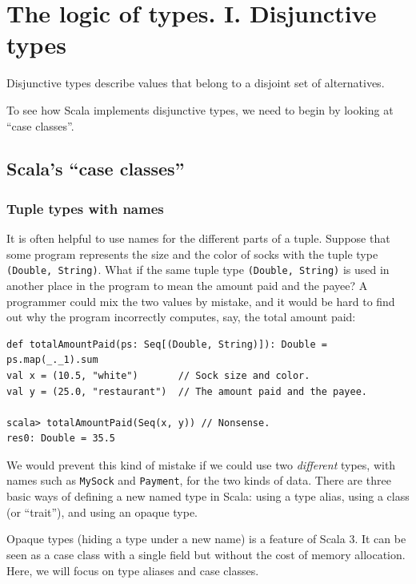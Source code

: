 
\chapter{The logic of types. I. Disjunctive types\label{chap:Disjunctive-types}}

Disjunctive types describe values that belong to a disjoint set of
alternatives. 

To see how Scala implements disjunctive types, we need to begin by
looking at \textsf{``}case classes\textsf{''}.

\section{Scala\textsf{'}s \textquotedblleft case classes\textquotedblright}

\subsection{Tuple types with names}

It is often helpful to use names for the different parts of a tuple.
Suppose that some program represents the size and the color of socks
with the tuple type \lstinline!(Double, String)!. What if the same
tuple type \lstinline!(Double, String)! is used in another place
in the program to mean the amount paid and the payee? A programmer
could mix the two values by mistake, and it would be hard to find
out why the program incorrectly computes, say, the total amount paid:
\begin{lstlisting}
def totalAmountPaid(ps: Seq[(Double, String)]): Double = ps.map(_._1).sum
val x = (10.5, "white")       // Sock size and color.
val y = (25.0, "restaurant")  // The amount paid and the payee.

scala> totalAmountPaid(Seq(x, y)) // Nonsense.
res0: Double = 35.5
\end{lstlisting}

We would prevent this kind of mistake if we could use two \emph{different}
types, with names such as \lstinline!MySock! and \lstinline!Payment!,
for the two kinds of data. There are  three basic ways of defining
a new named type in Scala: using a type alias, using a class (or \textsf{``}trait\textsf{''}),
and using an opaque type. 

Opaque types (hiding a type under a new name) is a feature of Scala
3. It can be seen as a case class with a single field but without
the cost of memory allocation. Here, we will focus on type aliases
and case classes.


